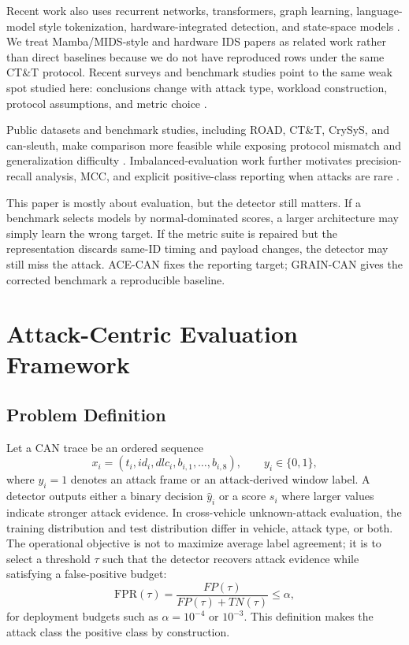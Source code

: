 \documentclass[runningheads]{llncs}%
\newcommand{\method}{GRAIN-CAN}
\newcommand{\framework}{ACE-CAN}
\begin{document}
Recent work also uses recurrent networks, transformers, graph learning, language-model style tokenization, hardware-integrated detection, and state-space models \cite{taylor2016frequency,kang2016survival,alkhatib2022canbert,wang2023statgraph,seccan2025,khandelsurvey2025,majumder2024uavcan,liu2026mids}.  We treat Mamba/MIDS-style and hardware IDS papers as related work rather than direct baselines because we do not have reproduced rows under the same CT\&T protocol.  Recent surveys and benchmark studies point to the same weak spot studied here: conclusions change with attack type, workload construction, protocol assumptions, and metric choice \cite{althunayyan2025survey,sharmin2024benchmarking,guerra2024road}.

Public datasets and benchmark studies, including ROAD, CT\&T, CrySyS, and can-sleuth, make comparison more feasible while exposing protocol mismatch and generalization difficulty \cite{verma2020road,lampe2024ctt,gazdag2023crysys,kidmose2025cansleuth}.  Imbalanced-evaluation work further motivates precision-recall analysis, MCC, and explicit positive-class reporting when attacks are rare \cite{davis2006pr,saito2015pr,chicco2020mcc}.

This paper is mostly about evaluation, but the detector still matters.  If a benchmark selects models by normal-dominated scores, a larger architecture may simply learn the wrong target.  If the metric suite is repaired but the representation discards same-ID timing and payload changes, the detector may still miss the attack.  \framework{} fixes the reporting target; \method{} gives the corrected benchmark a reproducible baseline.

\section{Attack-Centric Evaluation Framework}
\subsection{Problem Definition}
Let a CAN trace be an ordered sequence
\begin{equation}
    x_i=(t_i, id_i, dlc_i, b_{i,1},\ldots,b_{i,8}), \qquad y_i\in\{0,1\},
\end{equation}
where $y_i=1$ denotes an attack frame or an attack-derived window label.  A detector outputs either a binary decision $\hat{y}_i$ or a score $s_i$ where larger values indicate stronger attack evidence.  In cross-vehicle unknown-attack evaluation, the training distribution and test distribution differ in vehicle, attack type, or both.  The operational objective is not to maximize average label agreement; it is to select a threshold $\tau$ such that the detector recovers attack evidence while satisfying a false-positive budget:
\begin{equation}
    \mathrm{FPR}(\tau)=\frac{FP(\tau)}{FP(\tau)+TN(\tau)} \leq \alpha,
\end{equation}
for deployment budgets such as $\alpha=10^{-4}$ or $10^{-3}$.  This definition makes the attack class the positive class by construction.
\end{document}
